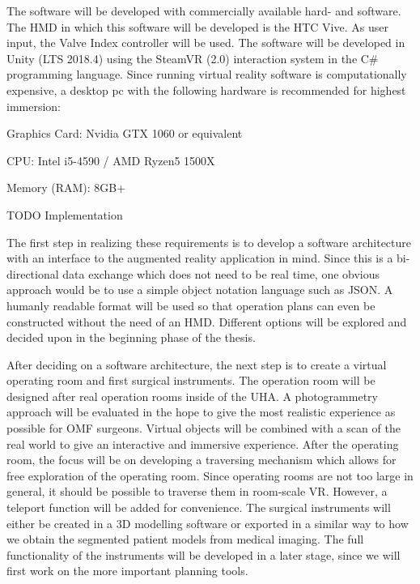 The software will be developed with commercially available hard- and software.
The HMD in which this software will be developed is the HTC Vive.
As user input, the Valve Index controller will be used.
The software will be developed in Unity (LTS 2018.4) using the SteamVR (2.0) interaction system in the C\# programming language.
Since running virtual reality software is computationally expensive, a desktop pc with the following hardware is recommended for highest immersion:

\begin{compactenum}[label=(\alph*)]
    \item Graphics Card: Nvidia GTX 1060 or equivalent
    \item CPU: Intel i5-4590 / AMD Ryzen5 1500X
    \item Memory (RAM): 8GB+
\end{compactenum}

TODO Implementation

The first step in realizing these requirements is to develop a software architecture with an interface to the augmented reality application in mind.
Since this is a bi-directional data exchange which does not need to be real time, one obvious approach would be to use a simple object notation language such as JSON.
A humanly readable format will be used so that operation plans can even be constructed without the need of an HMD.
Different options will be explored and decided upon in the beginning phase of the thesis.

After deciding on a software architecture, the next step is to create a virtual operating room and first surgical instruments.
The operation room will be designed after real operation rooms inside of the UHA.
A photogrammetry approach will be evaluated in the hope to give the most realistic experience as possible for OMF surgeons.
Virtual objects will be combined with a scan of the real world to give an interactive and immersive experience.
After the operating room, the focus will be on developing a traversing mechanism which allows for free exploration of the operating room.
Since operating rooms are not too large in general, it should be possible to traverse them in room-scale VR.
However, a teleport function will be added for convenience.
The surgical instruments will either be created in a 3D modelling software or exported in a similar way to how we obtain the segmented patient models from medical imaging.
The full functionality of the instruments will be developed in a later stage, since we will first work on the more important planning tools.

